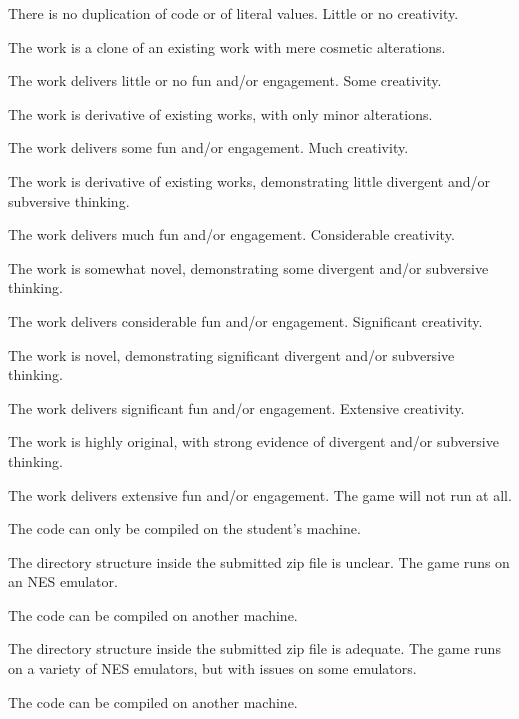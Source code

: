\documentclass{../../fal_assignment}
\begin{document}
\begin{markingrubric}
            \par There is no duplication of code or of literal values.
%
        \grade\fail Little or no creativity.
            \par The work is a clone of an existing work with mere cosmetic alterations.
            \par The work delivers little or no fun and/or engagement.
        \grade Some creativity.
            \par The work is derivative of existing works, with only minor alterations.
            \par The work delivers some fun and/or engagement.
        \grade Much creativity.
            \par The work is derivative of existing works, demonstrating little divergent and/or subversive thinking.
            \par The work delivers much fun and/or engagement.
        \grade Considerable creativity.
            \par The work is somewhat novel, demonstrating some divergent and/or subversive thinking.
            \par The work delivers considerable fun and/or engagement.
        \grade Significant creativity.
            \par The work is novel, demonstrating significant divergent and/or subversive thinking.
            \par The work delivers significant fun and/or engagement.
        \grade Extensive creativity.
            \par The work is highly original, with strong evidence of divergent and/or subversive thinking.
            \par The work delivers extensive fun and/or engagement.
%
        \grade\fail The game will not run at all.
        	\par The code can only be compiled on the student's machine.
            \par The directory structure inside the submitted zip file is unclear.
        \grade The game runs on an NES emulator.
        	\par The code can be compiled on another machine.
            \par The directory structure inside the submitted zip file is adequate.
        \grade The game runs on a variety of NES emulators, but with issues on some emulators.
        	\par The code can be compiled on another machine.

\end{markingrubric}
\end{document}
